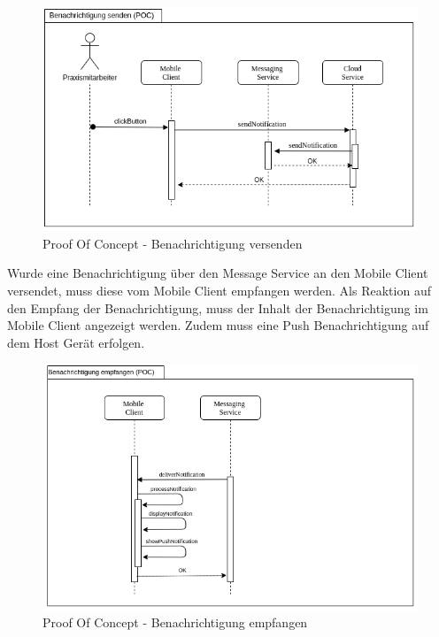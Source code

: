 \begin{figure}[h]
    \centering
    \begin{minipage}[b]{1.0\textwidth}
        \includegraphics[width=\textwidth]{graphics/Sequence_POC_Send}
        \caption{Proof Of Concept - Benachrichtigung versenden}
    \end{minipage}
\end{figure}

\clearpage


Wurde eine Benachrichtigung über den Message Service an den Mobile Client versendet, muss diese vom Mobile Client empfangen werden.
Als Reaktion auf den Empfang der Benachrichtigung, muss der Inhalt der Benachrichtigung im Mobile Client angezeigt werden. Zudem
muss eine Push Benachrichtigung auf dem Host Gerät erfolgen.

\begin{figure}[h]
    \centering
    \begin{minipage}[b]{1.0\textwidth}
        \includegraphics[width=\textwidth]{graphics/Sequence_POC_Receive}
        \caption{Proof Of Concept - Benachrichtigung empfangen}
    \end{minipage}
\end{figure}

\clearpage
